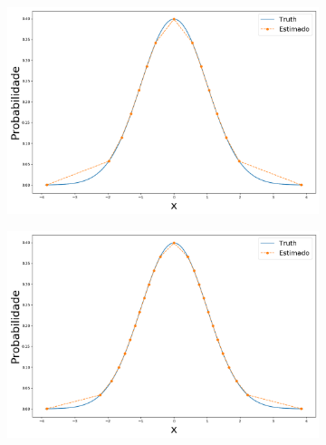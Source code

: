 \begin{figure}[H]
	\centering
	\begin{subfigure}[b]{0.45\textwidth}
		\centering 
		\includegraphics[width=\linewidth]{./figuras/iPDF1_normal_15}
		\caption{}
		\label{fig:ipdfnorm15}
	\end{subfigure}
	\hfill
	\begin{subfigure}[b]{0.45\textwidth}
		\centering 
		\includegraphics[width=\linewidth]{./figuras/iPDF1_normal_25}
		\caption{}
		\label{fig:ipdfnorm25}
	\end{subfigure}


\end{figure}
